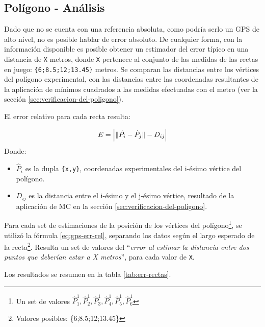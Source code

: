 \documentclass[main]{subfiles}
\begin{document}
\subsection{Polígono - Análisis}
\label{sec:poligono-analisis}

Dado que no se cuenta con una referencia absoluta, como podría serlo un GPS de alto nivel, no es posible hablar de error absoluto. De cualquier forma, con la información disponible es posible obtener un estimador del error típico en una distancia de \verb+X+ metros, donde \verb+X+ pertenece al conjunto de las medidas de las rectas en juego: \verb+{6;8.5;12;13.45}+ metros. Se comparan las distancias entre los vértices del polígono experimental, con las distancias entre las coordenadas resultantes de la aplicación de mínimos cuadrados a las medidas efectuadas con el metro (ver la sección \ref{sec:verificacion-del-poligono}).

El error relativo para cada recta resulta:

\begin{equation}
  \label{eq:gps-err-rel}
  E = \left|\|\hat{P}_{i} - \hat{P}_{j}\| - D_{ij}\right|
\vspace{-5pt}
\end{equation}
Donde:
\begin{itemize}
\item $\hat{P}_i$ es la dupla \verb+{x,y}+, coordenadas experimentales del i-ésimo vértice del polígono.
\item $D_{ij}$ es la distancia entre el i-ésimo y el j-ésimo vértice, resultado de la aplicación de MC en la sección \ref{sec:verificacion-del-poligono}.
\end{itemize}

Para cada set de estimaciones de la posición de los vértices del polígono\footnote{Un set de valores $\hat{P}_1^1,\hat{P}_2^1,\hat{P}_3^1,\hat{P}_4^1,\hat{P}_5^1,\hat{P}_6^1$}, se utilizó la fórmula \ref{eq:gps-err-rel}, separando los datos según el largo esperado de la recta\footnote{Valores posibles: \{6;8.5;12;13.45\}}. Resulta un set de valores del ``\textit{error al estimar la distancia entre dos puntos que deberían estar a X metros}'', para cada valor de \verb+X+. 

Los resultados se resumen en la tabla \ref{tab:err-rectas}.
\end{document}
